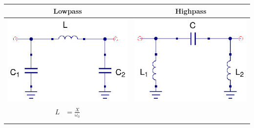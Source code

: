 \begin{table}[H]
  \centering
  \begin{tabular}{ | c | c | }
    \hline
    Lowpass & Highpass\\ \hline
    \begin{minipage}{.4\textwidth}
      \includegraphics[width=\linewidth]{Lowpass-Pi}
    \end{minipage}
    &
    \begin{minipage}{.4\textwidth}
      \includegraphics[width=\linewidth]{Highpass-Pi}
    \end{minipage}
\\ \hline
    \begin{minipage}{.4\textwidth}
         {\begin{align}
           L &= \frac{X}{\omega_0}\\

\end{align}}
\end{minipage}
\end{tabular}
\end{table}
